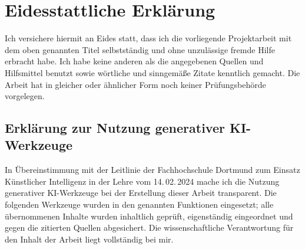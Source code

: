 \newpage
\thispagestyle{empty}
\section*{Eidesstattliche Erklärung}
\thispagestyle{empty}

Ich versichere hiermit an Eides statt, dass ich die vorliegende Projektarbeit mit dem oben genannten Titel selbstständig und ohne unzulässige fremde Hilfe erbracht habe. Ich habe keine anderen als die angegebenen Quellen und Hilfsmittel benutzt sowie wörtliche und sinngemäße Zitate kenntlich gemacht. Die Arbeit hat in gleicher oder ähnlicher Form noch keiner Prüfungsbehörde vorgelegen.

\vspace{1\baselineskip}

\subsection*{Erklärung zur Nutzung generativer KI-Werkzeuge}

In Übereinstimmung mit der Leitlinie der Fachhochschule Dortmund zum Einsatz Künstlicher Intelligenz in der Lehre vom 14.\,02.\,2024 mache ich die Nutzung generativer KI-Werkzeuge bei der Erstellung dieser Arbeit transparent. Die folgenden Werkzeuge wurden in den genannten Funktionen eingesetzt; alle übernommenen Inhalte wurden inhaltlich geprüft, eigenständig eingeordnet und gegen die zitierten Quellen abgesichert. Die wissenschaftliche Verantwortung für den Inhalt der Arbeit liegt vollständig bei mir.

